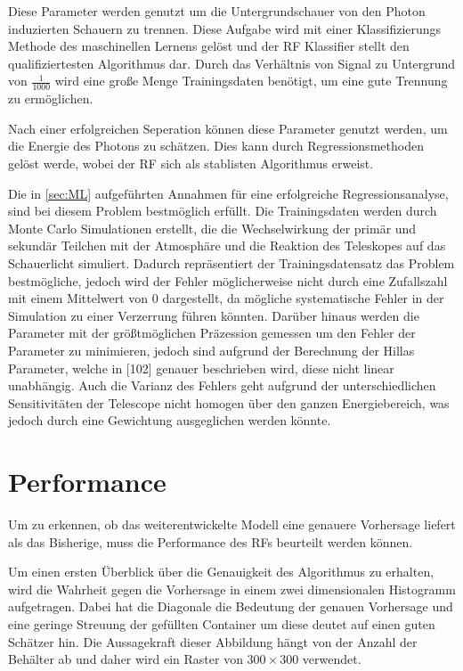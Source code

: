 Diese Parameter werden genutzt um die Untergrundschauer von den Photon induzierten Schauern zu trennen.
Diese Aufgabe wird mit einer Klassifizierungs Methode des maschinellen Lernens gelöst und der
RF Klassifier stellt den qualifiziertesten Algorithmus dar.
Durch das Verhältnis von Signal zu Untergrund von $\frac{1}{1000}$\cite{Cherenkov_Licht} wird eine große Menge Trainingsdaten
benötigt, um eine gute Trennung zu ermöglichen.

Nach einer erfolgreichen Seperation können diese Parameter genutzt werden, um die Energie des Photons zu schätzen.
Dies kann durch Regressionsmethoden gelöst werde, wobei der RF sich als stablisten Algorithmus erweist\cite{Cherenkov_Licht}.

Die in \autoref{sec:ML} aufgeführten Annahmen für eine erfolgreiche Regressionsanalyse, sind bei diesem Problem bestmöglich erfüllt. Die Trainingsdaten
werden durch Monte Carlo Simulationen erstellt, die die Wechselwirkung der primär und sekundär Teilchen mit der Atmosphäre und die Reaktion des Teleskopes
auf das Schauerlicht simuliert.
Dadurch repräsentiert der Trainingsdatensatz das Problem bestmögliche, jedoch wird der Fehler möglicherweise nicht durch eine Zufallszahl mit einem Mittelwert von $0$ dargestellt, da
mögliche systematische Fehler in der Simulation zu einer Verzerrung führen könnten.
Darüber hinaus werden die Parameter mit der größtmöglichen Präzession gemessen um den Fehler der Parameter zu minimieren,
jedoch sind aufgrund der Berechnung der Hillas Parameter, welche in [102]\cite{HESS}
genauer beschrieben wird, diese nicht linear unabhängig.
Auch die Varianz des Fehlers geht aufgrund der unterschiedlichen Sensitivitäten der Telescope nicht homogen
über den ganzen Energiebereich, was jedoch durch eine Gewichtung ausgeglichen werden könnte.

\section{Performance}
\label{sec:Per}

Um zu erkennen, ob das weiterentwickelte Modell eine genauere Vorhersage liefert als das Bisherige, muss die
Performance des RFs beurteilt werden können.

Um einen ersten Überblick über die Genauigkeit des Algorithmus zu erhalten, wird die Wahrheit gegen die Vorhersage in einem
zwei dimensionalen Histogramm aufgetragen.
Dabei hat die Diagonale die Bedeutung der genauen Vorhersage und eine geringe Streuung der gefüllten Container
um diese deutet auf einen guten Schätzer hin.
Die Aussagekraft dieser Abbildung hängt von der Anzahl der Behälter ab und daher wird ein Raster von $300 \times 300$ verwendet.

